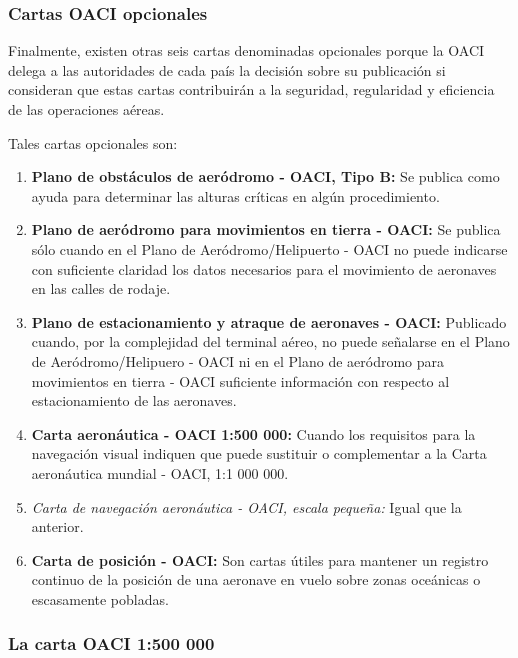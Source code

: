 \subsubsection{Cartas OACI opcionales}

Finalmente, existen otras seis cartas denominadas opcionales porque la OACI delega a las autoridades de cada pa\'is la decisi\'on sobre su publicaci\'on si consideran que estas cartas contribuir\'an a la seguridad, regularidad y eficiencia de las operaciones a\'ereas.

Tales cartas opcionales son:

\begin{enumerate}
\item \textbf{Plano de obst\'aculos de aer\'odromo - OACI, Tipo B:} Se publica
  como ayuda para determinar las alturas cr\'iticas en alg\'un
  procedimiento.

\item  \textbf{Plano de aer\'odromo para movimientos en tierra - OACI:} Se
  publica s\'olo cuando en el Plano de Aer\'odromo/Helipuerto - OACI
  no puede indicarse con suficiente claridad los datos necesarios para
  el movimiento de aeronaves en las calles de rodaje.

\item  \textbf{Plano de estacionamiento y atraque de aeronaves - OACI: }Publicado
  cuando, por la complejidad del terminal a\'ereo, no puede se\~nalarse en
  el Plano de Aer\'odromo/Helipuero - OACI ni en el Plano de
  aer\'odromo para movimientos en tierra - OACI suficiente
  informaci\'on con respecto al estacionamiento de las aeronaves.

\item  \textbf{Carta aeron\'autica - OACI 1:500 000:} Cuando los requisitos para la
  navegaci\'on visual indiquen que puede sustituir o complementar a la
  Carta aeron\'autica mundial - OACI, 1:1 000 000.

\item  \emph{Carta de navegaci\'on aeron\'autica - OACI, escala peque\~na:} Igual
  que la anterior.

\item \textbf{ Carta de posici\'on - OACI:} Son cartas \'utiles para mantener un
  registro continuo de la posici\'on de una aeronave en vuelo sobre
  zonas oce\'anicas o escasamente pobladas.
\end{enumerate}

\subsubsection{La carta OACI 1:500 000}

